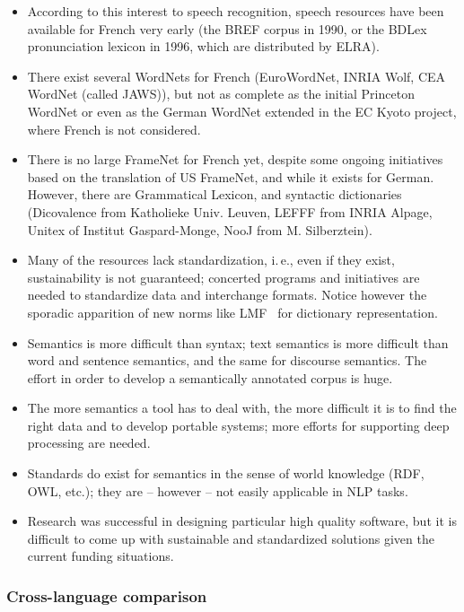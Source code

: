 \begin{multicols}{2}
\begin{itemize}
\item According to this interest to speech recognition, speech resources
have been available for French very early (the BREF corpus in 1990, or
the BDLex pronunciation lexicon in 1996, which are distributed by
ELRA).

\item There exist several WordNets for French (EuroWordNet, INRIA Wolf, CEA
WordNet (called JAWS)), but not as complete as the initial Princeton
WordNet or even as the German WordNet extended in the EC Kyoto
project, where French is not considered.

\item There is no large FrameNet for French yet, despite some ongoing
initiatives based on the translation of US FrameNet, and while it
exists for German. However, there are Grammatical Lexicon, and
syntactic dictionaries (Dicovalence from Katholieke Univ. Leuven,
LEFFF from INRIA Alpage, Unitex of Institut Gaspard-Monge, NooJ from M. Silberztein).

\item Many of the resources lack standardization, i.\,e., even if they
  exist, sustainability is not guaranteed; concerted programs and
  initiatives are needed to standardize data and interchange
  formats. Notice however the sporadic apparition of new norms like
  LMF~\cite{LMF} for dictionary representation.

\item Semantics is more difficult than syntax; text semantics is more
difficult than word and sentence semantics, and the same for discourse
semantics. The effort in order to develop a semantically annotated
corpus is huge.

\item The more semantics a tool has to deal with, the more difficult it is
to find the right data and to develop portable systems; more efforts
for supporting deep processing are needed.

\item Standards do exist for semantics in the sense of world knowledge (RDF,
OWL, etc.); they are – however – not easily applicable in NLP tasks.

\item Research was successful in designing particular high quality software,
but it is difficult to come up with sustainable and standardized
solutions given the current funding situations.
\end{itemize}

\subsubsection{Cross-language comparison}


\end{multicols}

